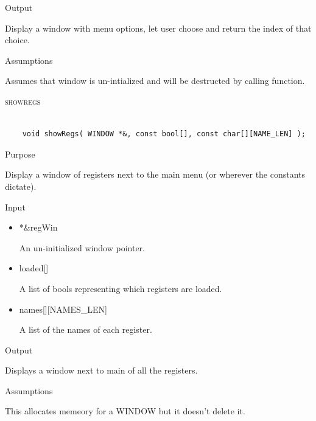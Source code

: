 \documentclass[pdftex, 11pt]{article}
\begin{document}
\begin{description}
\begin{description}
\begin{itemize}
				\end{itemize}

			\item{Output}
				
				Display a window with menu options, let user choose and
				return the index of that choice.

			\item{Assumptions}

				Assumes that window is un-intialized and will be destructed
				by calling function.

		\end{description}


	\item{\textsc{showregs}}

		\begin{lstlisting}

	void showRegs( WINDOW *&, const bool[], const char[][NAME_LEN] );	
		\end{lstlisting}

		\begin{description}
			\item{Purpose}

 				Display a window of registers next to the main menu (or wherever the constants
				dictate).

			\item{Input}
			
				\begin{itemize}

					\item{*\&regWin}
						
						An un-initialized window pointer.

					\item{loaded[]}

						A list of bools representing which registers are loaded.

					\item{names[][NAMES\_LEN]}

						A list of the names of each register.

				\end{itemize}

			\item{Output}

				Displays a window next to main of all the registers.

			\item{Assumptions}

				This allocates memeory for a WINDOW but it doesn't delete it.


\end{description}
\end{description}
\end{document}
